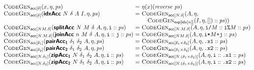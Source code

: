 \begin{figure}[H]
  \bigskip

  \begin{minipage}{1.0\linewidth}
    \begin{displaymath}
      \begin{array}{@{}l@{~}c@{~}l@{}}
        \codegenAcc{\delta}{x, \eta, \mathit{ps}}
        &=& \eta(x)(\mathit{reverse}~\mathit{ps})
        \\
        \codegenAcc{\mathsf{\delta}}{\prim{idxAcc}~N~\delta~A~I, \eta, \mathit{ps}}
        &=& \begin{array}[t]{@{}l}
          \codegenAcc{N.\delta}{A, \eta,\\ \quad\codegenExp{\tyidx[n]}{I, \eta, []} :: \mathit{ps})}
        \end{array}
        \\
        \codegenAcc{NM.\delta}{\prim{splitAcc}~N~M~\delta~A, \eta, \texttt{i} :: \mathit{ps}}
        &=& \codegenAcc{N.M.\delta}{A, \eta, \texttt{i/}M :: \texttt{i\%}M :: \mathit{ps}}
        \\
        \codegenAcc{N.M.\delta}{\prim{joinAcc}~n~M~\delta~A, \eta, \texttt{i} :: \texttt{j} :: \mathit{ps}}
        &=& \codegenAcc{NM.\delta}{A, \eta, \texttt{i*}M\texttt{+j} :: \mathit{ps}}
        \\
        \codegenAcc{\delta_1}{\prim{pairAcc_1}~\delta_1~\delta_2~A, \eta, \mathit{ps}}
        &=& \codegenAcc{\delta_1\times\delta_2}{A, \eta, \texttt{.x1} :: \mathit{ps}}
        \\
        \codegenAcc{\delta_2}{\prim{pairAcc_2}~\delta_1~\delta_2~A, \eta, \mathit{ps}}
        &=& \codegenAcc{\delta_1\times\delta_2}{A, \eta, \texttt{.x2} :: \mathit{ps}}
        \\
        \codegenAcc{N.\delta_1}{\prim{zipAcc_1}~N~\delta_1~\delta_2~A, \eta, \texttt{i} :: \mathit{ps}}
        &=& \codegenAcc{N.(\delta_1\times\delta_2)}{A, \eta, \texttt{i} :: \texttt{.x1} :: \mathit{ps}}
        \\
        \codegenAcc{N.\delta_2}{\prim{zipAcc_2}~N~\delta_1~\delta_2~A, \eta, \texttt{i} :: \mathit{ps}}
        &=& \codegenAcc{N.(\delta_1\times\delta_2)}{A, \eta, \texttt{i} :: \texttt{.x2} :: \mathit{ps}}
      \end{array}
    \end{displaymath}
    \label{fig:codegen-acc}
  \end{minipage}

  \bigskip


\end{figure}
